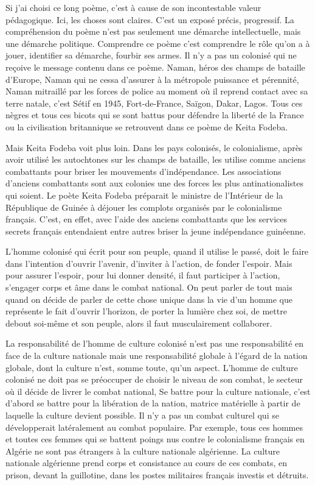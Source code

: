 \documentclass[french,twoside]{book} %
\begin{document}
\noindent Si j’ai choisi ce long poème, c’est à cause de son incontestable valeur pédagogique. Ici, les choses sont claires. C’est un exposé précis, progressif. La compréhension du poème n’est pas seulement une démarche intellectuelle, mais une démarche politique. Comprendre ce poème c’est comprendre le rôle qu’on a à jouer, identifier sa démarche, fourbir ses armes. Il n’y a pas un colonisé qui ne reçoive le message contenu dans ce poème. Naman, héros des champs de bataille d’Europe, Naman qui ne cessa d’assurer à la métropole puissance et pérennité, Naman mitraillé par les forces de police au moment où il reprend contact avec sa terre natale, c’est Sétif en 1945, Fort-de-France, Saïgon, Dakar, Lagos. Tous ces nègres et tous ces bicots qui se sont battus pour défendre la liberté de la France ou la civilisation britannique se retrouvent dans ce poème de Keita Fodeba.\par
\bigbreak
\noindent Mais Keita Fodeba voit plus loin. Dans les pays colonisés, le colonialisme, après avoir utilisé les autochtones sur les champs de bataille, les utilise comme anciens combattants pour briser les mouvements d’indépendance. Les associations d’anciens combattants sont aux colonies une des forces les plus antinationalistes qui soient. Le poète Keita Fodeba préparait le ministre   de l’Intérieur de la République de Guinée à déjouer les complots organisés par le colonialisme français. C’est, en effet, avec l’aide des anciens combattants que les services secrets français entendaient entre autres briser la jeune indépendance guinéenne.\par
\bigbreak
\noindent L’homme colonisé qui écrit pour son peuple, quand il utilise le passé, doit le faire dans l’intention d’ouvrir l’avenir, d’inviter à l’action, de fonder l’espoir. Mais pour assurer l’espoir, pour lui donner densité, il faut participer à l’action, s’engager corps et âme dans le combat national. On peut parler de tout mais quand on décide de parler de cette chose unique dans la vie d’un homme que représente le fait d’ouvrir l’horizon, de porter la lumière chez soi, de mettre debout soi-même et son peuple, alors il faut musculairement collaborer.\par
La responsabilité de l’homme de culture colonisé n’est pas une responsabilité en face de la culture nationale mais une responsabilité globale à l’égard de la nation globale, dont la culture n’est, somme toute, qu’un aspect. L’homme de culture colonisé ne doit pas se préoccuper de choisir le niveau de son combat, le secteur où il décide de livrer le combat national, Se battre pour la culture nationale, c’est d’abord se battre pour la libération de la nation, matrice matérielle à partir de laquelle la culture devient possible. Il n’y a pas un combat culturel qui se développerait latéralement au combat populaire. Par exemple, tous ces hommes et toutes ces femmes qui se battent poings nus contre le colonialisme français en Algérie ne sont pas étrangers à la culture nationale algérienne. La culture nationale algérienne prend corps et consistance au cours de ces combats, en prison, devant la guillotine, dans les postes militaires français investis et détruits.\par
\end{document}
